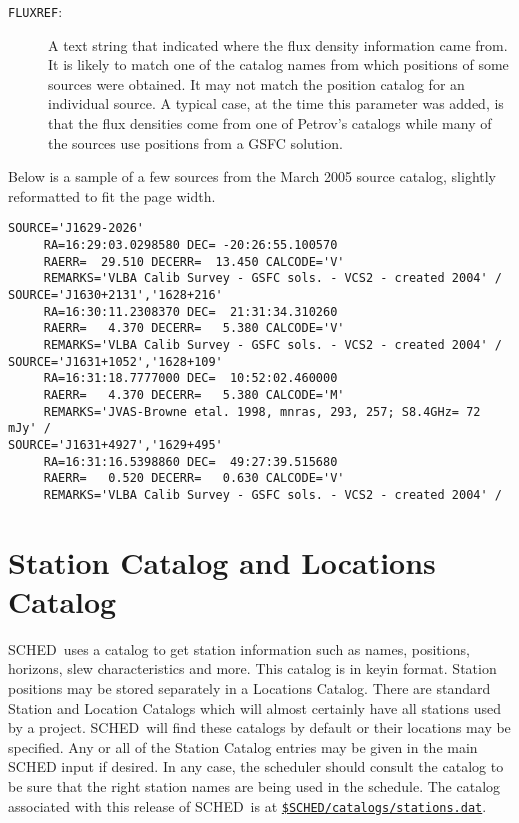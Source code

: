 \documentclass{report}
\newcommand{\schedb}{{\sc SCHED~}}
\begin{document}
\begin{description}
\item [{\tt FLUXREF}:] A text string that indicated where the flux
density information came from.  It is likely to match one of the
catalog names from which positions of some sources were obtained.
It may not match the position catalog for an individual source.  A
typical case, at the time this parameter was added, is that the flux
densities come from one of Petrov's catalogs while many of the sources
use positions from a GSFC solution.


\end{description}

Below is a sample of a few sources from the March 2005 source catalog,
slightly reformatted to fit the page width.

\begin{verbatim}
SOURCE='J1629-2026'
     RA=16:29:03.0298580 DEC= -20:26:55.100570 
     RAERR=  29.510 DECERR=  13.450 CALCODE='V'
     REMARKS='VLBA Calib Survey - GSFC sols. - VCS2 - created 2004' /
SOURCE='J1630+2131','1628+216'
     RA=16:30:11.2308370 DEC=  21:31:34.310260 
     RAERR=   4.370 DECERR=   5.380 CALCODE='V'
     REMARKS='VLBA Calib Survey - GSFC sols. - VCS2 - created 2004' /
SOURCE='J1631+1052','1628+109'
     RA=16:31:18.7777000 DEC=  10:52:02.460000 
     RAERR=   4.370 DECERR=   5.380 CALCODE='M'
     REMARKS='JVAS-Browne etal. 1998, mnras, 293, 257; S8.4GHz= 72 mJy' /
SOURCE='J1631+4927','1629+495'
     RA=16:31:16.5398860 DEC=  49:27:39.515680 
     RAERR=   0.520 DECERR=   0.630 CALCODE='V'
     REMARKS='VLBA Calib Survey - GSFC sols. - VCS2 - created 2004' /
\end{verbatim}


\section{\label{SEC:STACAT}Station Catalog and Locations Catalog}

\schedb uses a catalog to get station information such as names,
positions, horizons, slew characteristics and more.  This catalog is
in keyin format.  Station positions may be stored separately in a
Locations Catalog.  There are standard Station and Location Catalogs
which will almost certainly have all stations used by a project.
\schedb will find these catalogs by default or their locations may be
specified.  Any or all of the Station Catalog entries may be given in
the main {\sc SCHED} input if desired.  In any case, the scheduler
should consult the catalog to be sure that the right station names are
being used in the schedule.  The catalog associated with this release
of \schedb is at 
{\href{catalogs/stations.dat}{{\tt \$SCHED/catalogs/stations.dat}}}.
\end{document}
